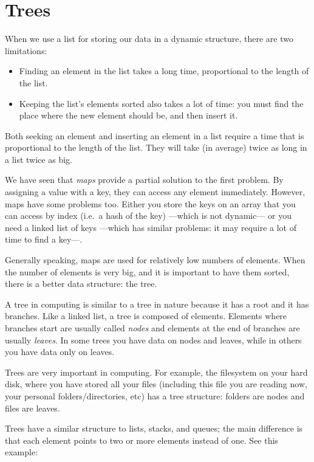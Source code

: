 
\section{Trees}
\label{sec:trees}

When we use a list for storing our data in a dynamic structure, 
there are two limitations: 

\begin{itemize}
\item Finding an element in the list takes a long time, proportional
  to the length of the list.
\item Keeping  the list's elements sorted also takes a lot of
  time: you must find the place where the new element should be, and
  then insert it. 
\end{itemize}

Both seeking an element and inserting an element in a list require a
time that is proportional to the length of the list. They will take
(in average) twice as long in a list twice as big. 

We have seen that \emph{maps} provide a partial solution to the first
problem. By assigning a value with a key, they can access any element
immediately. However, maps have some problems too. Either you store
the keys on an array that you can access by index (i.e.~a hash of the
key) ---which is not dynamic---
or you need a linked list of keys ---which has similar problems: it
may require a lot of time to find a key---. 

Generally speaking, maps are used for relatively low numbers of
elements. When the number of elements is very big, and it 
is important to have them sorted, there is a better data structure:
the tree. 

A tree in computing is similar to a tree in nature because it has a
root and it has branches. Like a linked list, a tree is composed of
elements. Elements where branches start are usually called
\emph{nodes} and elements at the end of branches are usually
\emph{leaves}. In some trees you have data on nodes and leaves, while
in others you have data only on leaves. 

Trees are very important in computing. For example, the filesystem on
your hard disk, where you have stored all your files (including this
file you are reading now, your personal folders/directories, etc) has
a tree structure: folders are nodes and files are leaves. 

Trees have a similar structure to lists, stacks, and queues; the main
difference is that each element points to two or more elements instead
of one. See this example: 

